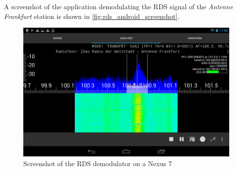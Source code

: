 A screenshot of the application demodulating the \ac{RDS} signal of the
\emph{Antenne Frankfurt} station is shown in \autoref{fig:rds_android_screenshot}.

\begin{figure}
	\centering
	\includegraphics[width=1\linewidth]{gfx/rds/android_screenshot.png}
	\caption{Screenshot of the RDS demodulator on a Nexus 7}
	\label{fig:rds_android_screenshot}
\end{figure}



